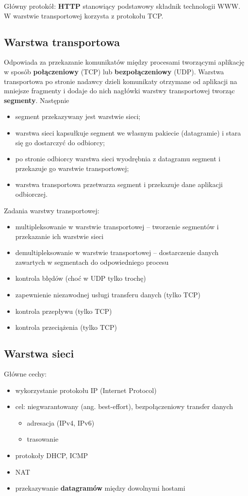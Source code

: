 Główny protokół: \textbf{HTTP} stanowiący podstawowy składnik technologii WWW. W warstwie transportowej korzysta z protokołu TCP.


\subsection{Warstwa transportowa}
Odpowiada za przekazanie komunikatów między procesami tworzącymi aplikację w sposób \textbf{połączeniowy} (TCP) lub \textbf{bezpołączeniowy} (UDP). Warstwa transportowa po stronie nadawcy
dzieli komunikaty otrzymane od aplikacji na mniejsze fragmenty i dodaje do nich nagłówki warstwy transportowej tworząc \textbf{segmenty}. Następnie
\begin{itemize}
    \item segment przekazywany jest warstwie sieci;
    \item warstwa sieci kapsułkuje segment we własnym pakiecie (datagramie) i stara się go dostarczyć do odbiorcy;
    \item po stronie odbiorcy warstwa sieci wyodrębnia z datagramu segment i przekazuje go warstwie transportowej;
    \item warstwa transportowa przetwarza segment i przekazuje dane aplikacji odbiorczej.
\end{itemize}

Zadania warstwy transportowej:
\begin{itemize}
    \item multipleksowanie w warstwie transportowej – tworzenie segmentów i przekazanie ich warstwie sieci
    \item demultipleksowanie w warstwie transportowej – dostarczenie danych zawartych w segmentach do odpowiedniego procesu
    \item kontrola błędów (choć w UDP tylko trochę)
    \item zapewnienie niezawodnej usługi transferu danych (tylko TCP)
    \item kontrola przepływu (tylko TCP)
    \item kontrola przeciążenia (tylko TCP)
\end{itemize}


\subsection{Warstwa sieci}
Główne cechy:
\begin{itemize}
    \item wykorzystanie protokołu IP (Internet Protocol)
    \item cel: niegwarantowany (ang. best-effort), bezpołączeniowy transfer danych
    \begin{itemize}
        \item adresacja (IPv4, IPv6)
        \item trasowanie
    \end{itemize}
    \item protokoły DHCP, ICMP
    \item NAT
    \item przekazywanie \textbf{datagramów} między dowolnymi hostami
\end{itemize}


